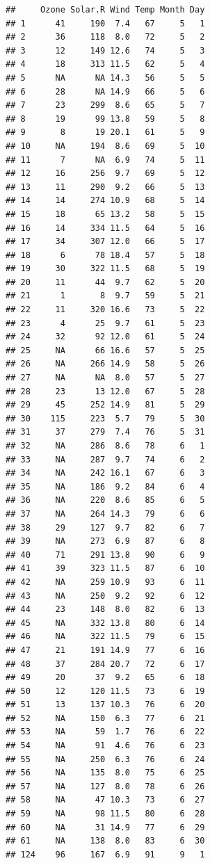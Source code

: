 \documentclass[11pt,]{book}
\begin{document}
\begin{verbatim}
##     Ozone Solar.R Wind Temp Month Day
## 1      41     190  7.4   67     5   1
## 2      36     118  8.0   72     5   2
## 3      12     149 12.6   74     5   3
## 4      18     313 11.5   62     5   4
## 5      NA      NA 14.3   56     5   5
## 6      28      NA 14.9   66     5   6
## 7      23     299  8.6   65     5   7
## 8      19      99 13.8   59     5   8
## 9       8      19 20.1   61     5   9
## 10     NA     194  8.6   69     5  10
## 11      7      NA  6.9   74     5  11
## 12     16     256  9.7   69     5  12
## 13     11     290  9.2   66     5  13
## 14     14     274 10.9   68     5  14
## 15     18      65 13.2   58     5  15
## 16     14     334 11.5   64     5  16
## 17     34     307 12.0   66     5  17
## 18      6      78 18.4   57     5  18
## 19     30     322 11.5   68     5  19
## 20     11      44  9.7   62     5  20
## 21      1       8  9.7   59     5  21
## 22     11     320 16.6   73     5  22
## 23      4      25  9.7   61     5  23
## 24     32      92 12.0   61     5  24
## 25     NA      66 16.6   57     5  25
## 26     NA     266 14.9   58     5  26
## 27     NA      NA  8.0   57     5  27
## 28     23      13 12.0   67     5  28
## 29     45     252 14.9   81     5  29
## 30    115     223  5.7   79     5  30
## 31     37     279  7.4   76     5  31
## 32     NA     286  8.6   78     6   1
## 33     NA     287  9.7   74     6   2
## 34     NA     242 16.1   67     6   3
## 35     NA     186  9.2   84     6   4
## 36     NA     220  8.6   85     6   5
## 37     NA     264 14.3   79     6   6
## 38     29     127  9.7   82     6   7
## 39     NA     273  6.9   87     6   8
## 40     71     291 13.8   90     6   9
## 41     39     323 11.5   87     6  10
## 42     NA     259 10.9   93     6  11
## 43     NA     250  9.2   92     6  12
## 44     23     148  8.0   82     6  13
## 45     NA     332 13.8   80     6  14
## 46     NA     322 11.5   79     6  15
## 47     21     191 14.9   77     6  16
## 48     37     284 20.7   72     6  17
## 49     20      37  9.2   65     6  18
## 50     12     120 11.5   73     6  19
## 51     13     137 10.3   76     6  20
## 52     NA     150  6.3   77     6  21
## 53     NA      59  1.7   76     6  22
## 54     NA      91  4.6   76     6  23
## 55     NA     250  6.3   76     6  24
## 56     NA     135  8.0   75     6  25
## 57     NA     127  8.0   78     6  26
## 58     NA      47 10.3   73     6  27
## 59     NA      98 11.5   80     6  28
## 60     NA      31 14.9   77     6  29
## 61     NA     138  8.0   83     6  30
## 124    96     167  6.9   91     9   1

\end{verbatim}
\end{document}
